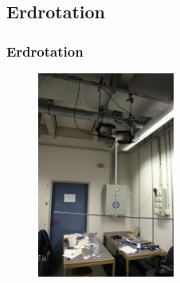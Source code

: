 \documentclass[10pt]{beamer}
\begin{document}
\subsection[]{Erdrotation}
\frame
{
\frametitle{Erdrotation}
\begin{figure}
\begin{center}
\includegraphics[width=0.4\textwidth]{./images/prIMG_7266.jpg}
\end{center}
\end{figure}
}
\end{document}
